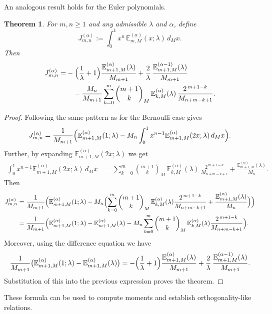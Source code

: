 \documentclass[12pt, a4paper]{article}
\newtheorem{theorem}{Theorem}[section]
\theoremstyle{definition}
\numberwithin{equation}{section}
\newcommand{\E}{\mathbb{E}}
\begin{document}
An analogous result holds for the Euler polynomials.
\begin{theorem}\label{thm:int-euler-recurrence}
For $m,n\ge 1$ and any admissible $\lambda$ and $\alpha$, define
\[
J_{m,n}^{(\alpha)}:=\int_0^1 x^n\,\E_{m,M}^{(\alpha)}(x;\lambda)\,d_M x.
\]
Then
\begin{equation}\label{eq:euler-recurrence}
\begin{aligned}
J_{m,n}^{(\alpha)} = &-\Bigl(\frac{1}{\lambda}+1\Bigr)\frac{\E_{m+1,M}^{(\alpha)}(\lambda)}{M_{m+1}}
      +\frac{2}{\lambda}\,\frac{\E_{m+1,M}^{(\alpha-1)}(\lambda)}{M_{m+1}} \\
     &\quad- \frac{M_n}{M_{m+1}}\sum_{k=0}^{m}\binom{m+1}{k}_M\,
        \E_{k,M}^{(\alpha)}(\lambda)\,\frac{2^{\,m+1-k}}{M_{n+m-k+1}}.
\end{aligned}
\end{equation}
\end{theorem}

\begin{proof}
Following the same pattern as for the Bernoulli case gives
\[
J_{m,n}^{(\alpha)}=\frac{1}{M_{m+1}}\Bigl(
   \E_{m+1,M}^{(\alpha)}(1;\lambda)
   -M_n\int_0^1 x^{n-1}\E_{m+1,M}^{(\alpha)}(2x;\lambda)\,d_M x\Bigr).
\]
Further, by expanding $\E_{m+1,M}^{(\alpha)}(2x;\lambda)$ we get
\begin{align*}
\int_0^1 x^{n-1}\E_{m+1,M}^{(\alpha)}(2x;\lambda)\,d_M x
   &= \sum_{k=0}^{m}\binom{m+1}{k}_M\,
      \E_{k,M}^{(\alpha)}(\lambda)\,\frac{2^{\,m+1-k}}{M_{n+m-k+1}}
     + \frac{\E_{m+1,M}^{(\alpha)}(\lambda)}{M_n}.
\end{align*}
Then
\begin{align*}
J_{m,n}^{(\alpha)} &=\frac{1}{M_{m+1}}\Bigl(
   \E_{m+1,M}^{(\alpha)}(1;\lambda)
   -M_n\Bigl(\sum_{k=0}^{m}\binom{m+1}{k}_M\,
      \E_{k,M}^{(\alpha)}(\lambda)\frac{2^{\,m+1-k}}{M_{n+m-k+1}}
      +\frac{\E_{m+1,M}^{(\alpha)}(\lambda)}{M_n}\Bigr)\Bigr)\\
&=\frac{1}{M_{m+1}}\Bigl(
   \E_{m+1,M}^{(\alpha)}(1;\lambda)-\E_{m+1,M}^{(\alpha)}(\lambda)
   -M_n\sum_{k=0}^{m}\binom{m+1}{k}_M\,
      \E_{k,M}^{(\alpha)}(\lambda)\frac{2^{\,m+1-k}}{M_{n+m-k+1}}\Bigr).
\end{align*}
Moreover, using the difference equation we have
\[
\frac{1}{M_{m+1}}\bigl(\E_{m+1,M}^{(\alpha)}(1;\lambda)-\E_{m+1,M}^{(\alpha)}(\lambda)\bigr)
   = -\Bigl(\frac{1}{\lambda}+1\Bigr)\frac{\E_{m+1,M}^{(\alpha)}(\lambda)}{M_{m+1}}
     +\frac{2}{\lambda}\,\frac{\E_{m+1,M}^{(\alpha-1)}(\lambda)}{M_{m+1}}.
\]
Substitution of this into the previous expression proves the theorem.  
\end{proof}
These formula can be used to compute moments and establish orthogonality-like relations.
\end{document}
